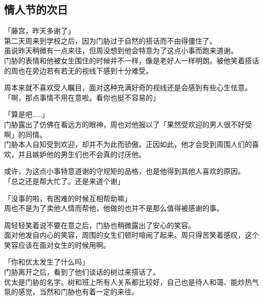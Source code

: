 \subsection{情人节的次日}

「藤宫，昨天多谢了」\\

第二天周来到学校之后，因为门胁过于自然的搭话而不由得僵住了。\\

虽说昨天稍微有一点来往，但周没想到他会特意为了这点小事而跑来道谢。\\

门胁的表情和他被女生围住的时候并不一样，像是老好人一样明朗。被他笑着搭话的周也在旁边若有若无的视线下感到十分难受。

周本来就不喜欢受人瞩目，面对这种充满好奇的视线还是会感到有些心生怯意。\\

「啊，那点事情不用在意啦。看你也挺不容易的」

「算是吧……」\\

门胁露出了仿佛在看远方的眼神，周也对他报以了「果然受欢迎的男人很不好受啊」的同情。\\

门胁本人自知受到欢迎，却并不为此而骄傲。正因如此，他才会受到周围人们的喜欢，并且嫉妒他的男生们也不会真的讨厌他。

或许，为这点小事特意道谢的守规矩的品格，也是他得到其他人喜欢的原因。\\

「总之还是帮大忙了。还是来道个谢」

「没事的啦，有困难的时候互相帮助嘛」\\

周也不是为了卖他人情而帮他，他做的也并不是那么值得被感谢的事。

周轻轻笑着说不要在意之后，门胁也稍微露出了安心的笑容。\\

面对他发自内心的笑容，周围的女生们顿时喧闹了起来。周只得苦笑着感叹，这个笑容应该在面对女生的时候用啊。\\

\vspace{2\baselineskip}

「你和优太发生了什么吗」\\

门胁离开之后，看到了他们谈话的树过来搭话了。\\

优太是门胁的名字。树和班上所有人关系都比较好，自己也是待人和蔼、能炒热气氛的感觉，当然和门胁也有着一定的来往。

